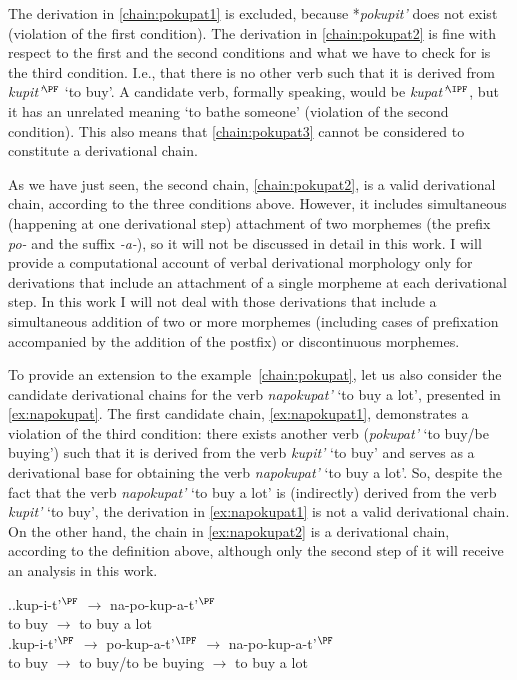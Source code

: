 The derivation in \ref{chain:pokupat1} is excluded, because *\textit{pokupit'} does not exist (violation of the first condition). The derivation in \ref{chain:pokupat2} is fine with respect to the first and the second conditions and what we have to check for is the third condition. I.e., that there is no other verb such that it is derived from \textit{kupit'}$^{\PF}$ `to buy'.  A candidate verb, formally speaking, would be \textit{kupat'$^{\IPF}$}, but it has an unrelated meaning `to bathe someone' (violation of the second condition). This also means that \ref{chain:pokupat3} cannot be considered to constitute a derivational chain.  

As we have just seen, the second chain, \ref{chain:pokupat2}, is a valid derivational chain, according to the three conditions above. However, it includes simultaneous (happening at one derivational step) attachment of two morphemes (the prefix \textit{po-} and the suffix \textit{-a-}), so it will not be discussed in detail in this work. I will provide a computational account of verbal derivational morphology only for derivations that include an attachment of a single morpheme at each derivational step. In this work I will not deal with those derivations that include a simultaneous addition of two or more morphemes (including cases of prefixation accompanied by the addition of the postfix) or discontinuous morphemes.

To provide an extension to the example~\ref{chain:pokupat}, let us also consider the candidate derivational chains for the verb \textit{napokupat'} `to buy a lot', presented in \ref{ex:napokupat}. The first candidate chain, \ref{ex:napokupat1}, demonstrates a violation of the third condition: there exists another verb (\textit{pokupat'} `to buy/be buying') such that it is derived from the verb \textit{kupit'} `to buy' and serves as a derivational base for obtaining the verb \textit{napokupat'} `to buy a lot'. So, despite the fact that the verb \textit{napokupat'} `to buy a lot' is (indirectly) derived from the verb \textit{kupit'} `to buy', the derivation in \ref{ex:napokupat1} is not a valid derivational chain. On the other hand, the chain in \ref{ex:napokupat2} is a derivational chain, according to the definition above, although only the second step of it will receive an analysis in this work. 

\ex.\label{ex:napokupat}\ag.\label{ex:napokupat1}kup-i-t'$^{\PF}$ $\rightarrow$ na-po-kup-a-t'$^{\PF}$\\	
{to buy} $\rightarrow$ {to buy a lot}\\
\bg.\label{ex:napokupat2}kup-i-t'$^{\PF}$ $\rightarrow$ po-kup-a-t'$^{\IPF}$ $\rightarrow$ na-po-kup-a-t'$^{\PF}$\\
{to buy} $\rightarrow$ {to buy/to be buying} $\rightarrow$ {to buy a lot}\\

